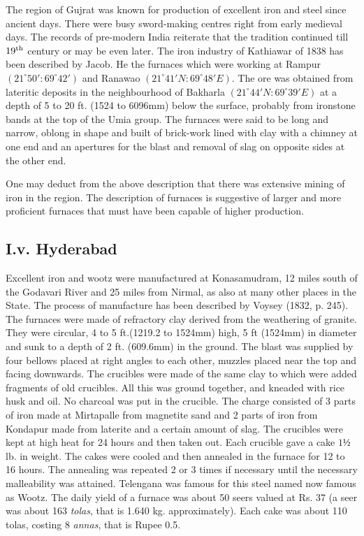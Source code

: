 The region of Gujrat was known for production of excellent iron and steel since ancient days. There were busy sword-making centres right from early medieval days. The records of pre-modern India reiterate that the tradition continued till $19^{\rm th}$ century or may be even later. The iron industry of Kathiawar of 1838 has been described by Jacob. He the furnaces which were working at Rampur $(21^\circ 50': 69^\circ 42')$ and Ranawao $(21^\circ 41'N: 69^\circ 48'E)$. The ore was obtained from lateritic deposits in the neighbourhood of Bakharla $(21^\circ 44'N: 69^\circ 39'E)$ at a depth of 5 to 20 ft. (1524 to 6096mm) below the surface, probably from ironstone bands at the top of the Umia group.  The furnaces were said to be long and narrow, oblong in shape and built of brick-work lined with clay with a chimney at one end and an apertures for the blast and removal of slag on opposite sides at the other end. 

One may deduct from the above description that there was extensive mining of iron in the region. The description of furnaces is suggestive of larger and more proficient furnaces that must have been capable of higher production. 

\subsection*{I.v.  Hyderabad}\label{subsection-5}

Excellent iron and wootz were manufactured at Konasamudram, 12 miles south of the Godavari River and 25 miles from Nirmal, as also at many other places in the State. The process of manufacture has been described by Voysey (1832, p. 245). The furnaces were made of refractory clay derived from the weathering of granite.  They were circular, 4 to 5 ft.(1219.2 to 1524mm) high, 5 ft (1524mm) in diameter and sunk to a depth of 2 ft. (609.6mm) in the ground.  The blast was supplied by four bellows placed at right angles to each other, muzzles placed near the top and facing downwards.  The crucibles were made of the same clay to which were added fragments of old crucibles. All this was ground together, and kneaded with rice husk and oil. No charcoal was put in the crucible.  The charge consisted of 3 parts of iron made at Mirtapalle from magnetite sand and 2 parts of iron from Kondapur made from laterite and a certain amount of slag.  The crucibles were kept at high heat for 24 hours and then taken out.  Each crucible gave a cake $1½$ lb. in weight.  The cakes were cooled and then annealed in the furnace for 12 to 16 hours.  The annealing was repeated 2 or 3 times if necessary until the necessary malleability was attained.  Telengana was famous for this steel named   now famous as Wootz.  The daily yield of a furnace was about 50 seers valued at Rs. 37 (a seer was about 163 {\it tolas}, that is 1.640 kg. approximately). Each cake was about 110 tolas, costing 8 {\it annas}, that is Rupee 0.5.


